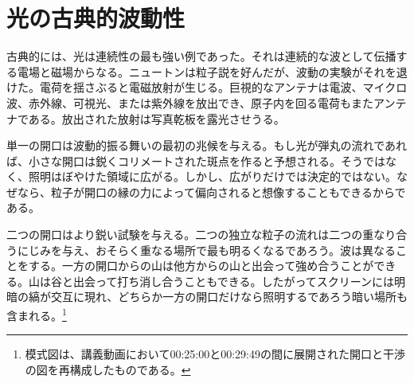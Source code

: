 \section{光の古典的波動性}

古典的には、光は連続性の最も強い例であった。それは連続的な波として伝播する電場と磁場からなる。ニュートンは粒子説を好んだが、波動の実験がそれを退けた。電荷を揺さぶると電磁放射が生じる。巨視的なアンテナは電波、マイクロ波、赤外線、可視光、または紫外線を放出でき、原子内を回る電荷もまたアンテナである。放出された放射は写真乾板を露光させうる。

単一の開口は波動的振る舞いの最初の兆候を与える。もし光が弾丸の流れであれば、小さな開口は鋭くコリメートされた斑点を作ると予想される。そうではなく、照明はぼやけた領域に広がる。しかし、広がりだけでは決定的ではない。なぜなら、粒子が開口の縁の力によって偏向されると想像することもできるからである。

二つの開口はより鋭い試験を与える。二つの独立な粒子の流れは二つの重なり合うにじみを与え、おそらく重なる場所で最も明るくなるであろう。波は異なることをする。一方の開口からの山は他方からの山と出会って強め合うことができる。山は谷と出会って打ち消し合うこともできる。したがってスクリーンには明暗の縞が交互に現れ、どちらか一方の開口だけなら照明するであろう暗い場所も含まれる。\footnote{模式図は、講義動画において00:25:00と00:29:49の間に展開された開口と干渉の図を再構成したものである。}

